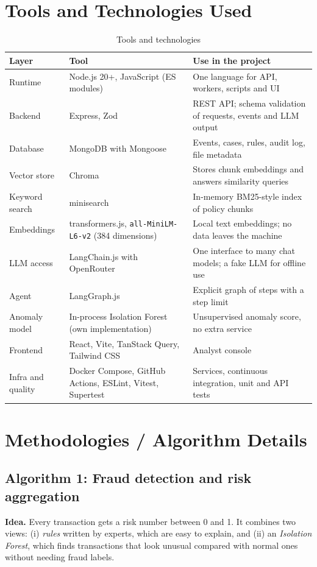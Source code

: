 \documentclass[oneside,a4paper,12pt]{report}
\begin{document}
\section{Tools and Technologies Used}
\begin{table}[H]
\centering\small
\begin{tabularx}{\textwidth}{|l|l|X|}
\hline
\textbf{Layer} & \textbf{Tool} & \textbf{Use in the project} \\ \hline
Runtime & Node.js 20+, JavaScript (ES modules) & One language for API, workers, scripts and UI \\ \hline
Backend & Express, Zod & REST API; schema validation of requests, events and LLM output \\ \hline
Database & MongoDB with Mongoose & Events, cases, rules, audit log, file metadata \\ \hline
Vector store & Chroma & Stores chunk embeddings and answers similarity queries \\ \hline
Keyword search & minisearch & In-memory BM25-style index of policy chunks \\ \hline
Embeddings & transformers.js, \texttt{all-MiniLM-L6-v2} (384 dimensions) & Local text embeddings; no data leaves the machine \\ \hline
LLM access & LangChain.js with OpenRouter & One interface to many chat models; a fake LLM for offline use \\ \hline
Agent & LangGraph.js & Explicit graph of steps with a step limit \\ \hline
Anomaly model & In-process Isolation Forest (own implementation) & Unsupervised anomaly score, no extra service \\ \hline
Frontend & React, Vite, TanStack Query, Tailwind CSS & Analyst console \\ \hline
Infra and quality & Docker Compose, GitHub Actions, ESLint, Vitest, Supertest & Services, continuous integration, unit and API tests \\ \hline
\end{tabularx}
\caption{Tools and technologies}
\end{table}

\section{Methodologies / Algorithm Details}

\subsection{Algorithm 1: Fraud detection and risk aggregation}
\textbf{Idea.} Every transaction gets a risk number between 0 and 1. It combines two views: (i) \emph{rules} written by experts, which are easy to explain, and (ii) an \emph{Isolation Forest}, which finds transactions that look unusual compared with normal ones without needing fraud labels.
\end{document}
